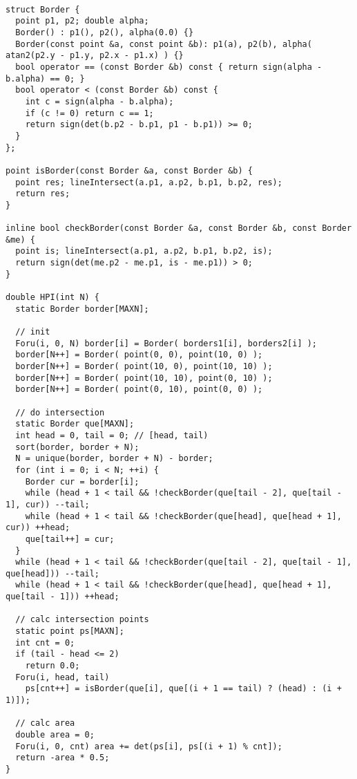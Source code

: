 \begin{lstlisting}

struct Border {
  point p1, p2; double alpha;
  Border() : p1(), p2(), alpha(0.0) {}
  Border(const point &a, const point &b): p1(a), p2(b), alpha( atan2(p2.y - p1.y, p2.x - p1.x) ) {}
  bool operator == (const Border &b) const { return sign(alpha - b.alpha) == 0; }
  bool operator < (const Border &b) const {
    int c = sign(alpha - b.alpha);
    if (c != 0) return c == 1;
    return sign(det(b.p2 - b.p1, p1 - b.p1)) >= 0;
  }
};

point isBorder(const Border &a, const Border &b) {
  point res; lineIntersect(a.p1, a.p2, b.p1, b.p2, res);
  return res;
}

inline bool checkBorder(const Border &a, const Border &b, const Border &me) {
  point is; lineIntersect(a.p1, a.p2, b.p1, b.p2, is);
  return sign(det(me.p2 - me.p1, is - me.p1)) > 0;
}

double HPI(int N) {
  static Border border[MAXN];

  // init
  Foru(i, 0, N) border[i] = Border( borders1[i], borders2[i] );
  border[N++] = Border( point(0, 0), point(10, 0) );
  border[N++] = Border( point(10, 0), point(10, 10) );
  border[N++] = Border( point(10, 10), point(0, 10) );
  border[N++] = Border( point(0, 10), point(0, 0) );

  // do intersection
  static Border que[MAXN];
  int head = 0, tail = 0; // [head, tail)
  sort(border, border + N);
  N = unique(border, border + N) - border;
  for (int i = 0; i < N; ++i) {
    Border cur = border[i];
    while (head + 1 < tail && !checkBorder(que[tail - 2], que[tail - 1], cur)) --tail;
    while (head + 1 < tail && !checkBorder(que[head], que[head + 1], cur)) ++head;
    que[tail++] = cur;
  }
  while (head + 1 < tail && !checkBorder(que[tail - 2], que[tail - 1], que[head])) --tail;
  while (head + 1 < tail && !checkBorder(que[head], que[head + 1], que[tail - 1])) ++head;

  // calc intersection points
  static point ps[MAXN];
  int cnt = 0;
  if (tail - head <= 2)
    return 0.0;
  Foru(i, head, tail)
    ps[cnt++] = isBorder(que[i], que[(i + 1 == tail) ? (head) : (i + 1)]);
  
  // calc area
  double area = 0;
  Foru(i, 0, cnt) area += det(ps[i], ps[(i + 1) % cnt]);
  return -area * 0.5;
}


\end{lstlisting}